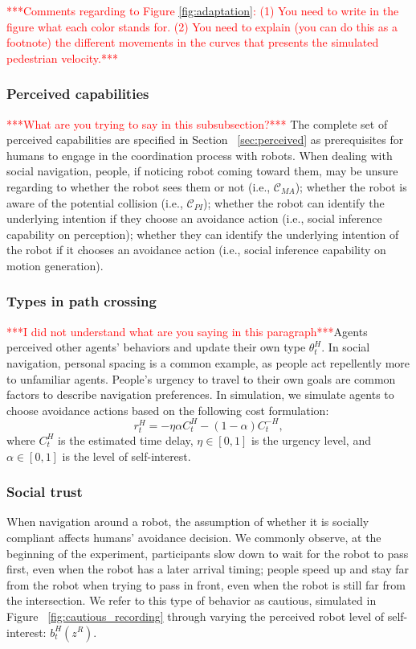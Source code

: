 \documentclass[letterpaper, 10 pt, conference]{ieeeconf}  %
\begin{document}
\textcolor{red}{***Comments regarding to Figure \ref{fig:adaptation}: (1) You need to write in the figure what each color stands for. (2) You need to explain (you can do this as a footnote) the different movements in the curves that presents the simulated pedestrian velocity.***}

\subsubsection{Perceived capabilities}
\textcolor{red}{***What are you trying to say in this subsubsection?***} The complete set of perceived capabilities are specified in Section ~\ref{sec:perceived} as 
prerequisites for humans to engage in the coordination process with robots. When dealing with social navigation, people, if noticing robot coming toward them, may be unsure regarding to whether the robot sees them or not (i.e., $\mathcal{C}_{MA}$); whether the robot is aware of the potential collision (i.e., $\mathcal{C}_{PI}$); whether the robot can identify the underlying intention if they choose an avoidance action (i.e., social inference capability on perception); whether they can identify the underlying intention of the robot if it chooses an avoidance action (i.e., social inference capability on motion generation). 

\subsubsection{Types in path crossing}
\textcolor{red}{***I did not understand what are you saying in this paragraph***}Agents perceived other agents' behaviors and update their own type $\theta^H_t$. In social navigation, personal spacing is a common example, as people act repellently more to unfamiliar agents. People's urgency to travel to their own goals are common factors to describe navigation preferences. In simulation, we simulate agents to choose avoidance actions based on the following cost formulation:
\begin{equation}
  r^H_t = -\eta \alpha C^H_t  -(1-\alpha) C^{-H}_t,
\end{equation}
where $C^H_t$ is the estimated time delay, $\eta \in [0,1]$ is the urgency 
level, and $\alpha \in [0,1]$ is the level of self-interest.

\subsubsection{Social trust}
When navigation around a robot, the assumption of whether it is socially compliant affects humans' avoidance decision. We commonly observe, at the beginning of the experiment, participants slow down to wait for the robot to pass first, even when the robot has a later arrival timing; people speed up and stay far from the robot when trying to pass in front, even when the robot is still far from the intersection. 
We refer to this type of behavior as cautious, simulated in Figure ~\ref{fig:cautious_recording} through 
varying the perceived robot level of self-interest: $b^H_t(z^R)$. 
\end{document}

